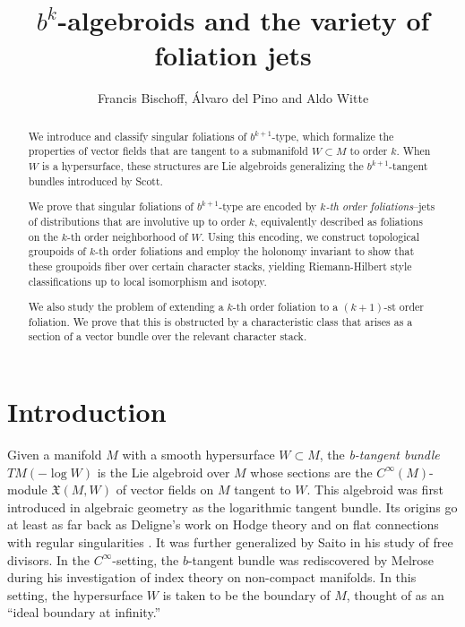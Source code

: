 \documentclass[10pt]{amsart}
\title{$b^k$-algebroids and the variety of foliation jets}
\author{Francis Bischoff, \'Alvaro del Pino and Aldo Witte}
\numberwithin{theoremalpha}{section}
\numberwithin{equation}{section}
\numberwithin{definition}{section}
\numberwithin{theorem}{section}
\numberwithin{proposition}{section}
\numberwithin{lemma}{section}
\numberwithin{example}{section}
\numberwithin{remark}{section}
\numberwithin{corollary}{section}
\numberwithin{question}{section}
\numberwithin{problem}{section}
\numberwithin{assumption}{section}
\theoremstyle{named}
\numberwithin{equation}{section}
\begin{document}
\begin{abstract}

We introduce and classify singular foliations of $b^{k+1}$-type, which formalize the properties of vector fields that are tangent to a submanifold $W \subset M$ to order $k$. When $W$ is a hypersurface, these structures are Lie algebroids generalizing the $b^{k+1}$-tangent bundles introduced by Scott.

We prove that singular foliations of $b^{k+1}$-type are encoded by \emph{$k$-th order foliations}--jets of distributions that are involutive up to order $k$, equivalently described as foliations on the $k$-th order neighborhood of $W$. Using this encoding, we construct topological groupoids of $k$-th order foliations and employ the holonomy invariant to show that these groupoids fiber over certain character stacks, yielding Riemann-Hilbert style classifications up to local isomorphism and isotopy.

We also study the problem of extending a $k$-th order foliation to a $(k+1)$-st order foliation. We prove that this is obstructed by a characteristic class that arises as a section of a vector bundle over the relevant character stack. 

\end{abstract}

\maketitle




\tableofcontents


\section{Introduction} \label{sec:introduction}

Given a manifold $M$ with a smooth hypersurface $W \subset M$, the \emph{b-tangent bundle} $TM(- \log W)$ is the Lie algebroid over $M$ whose sections are the $C^{\infty}(M)$-module $\mathfrak{X}(M,W)$ of vector fields on $M$ tangent to $W$. This algebroid was first introduced in algebraic geometry as the logarithmic tangent bundle. Its origins go at least as far back as Deligne's work on Hodge theory \cite{deligne1971hodge} and on flat connections with regular singularities \cite{MR0417174}. It was further generalized by Saito \cite{saito1980theory} in his study of free divisors. In the $C^{\infty}$-setting, the $b$-tangent bundle was rediscovered by Melrose \cite{MR1348401} during his investigation of index theory on non-compact manifolds. In this setting, the hypersurface $W$ is taken to be the boundary of $M$, thought of as an ``ideal boundary at infinity.''
\end{document}
